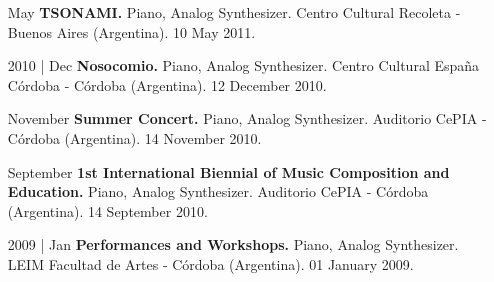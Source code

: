 \documentclass[12pt,overlapped]{res}%
\begin{document}
\begin{resume}
\begin{itemize}[align=parleft,leftmargin=2.25cm,labelwidth=2cm]
\item[May]
\textbf{TSONAMI.}
Piano, Analog Synthesizer. 
Centro Cultural Recoleta {-} Buenos Aires (Argentina). 
10 May 2011.
\end{itemize}%
\begin{itemize}[align=parleft,leftmargin=2.25cm,labelwidth=2cm]
\item[2010 | Dec]
\textbf{Nosocomio.}
Piano, Analog Synthesizer. 
Centro Cultural España Córdoba {-} Córdoba (Argentina). 
12 December 2010.
\end{itemize}%
\begin{itemize}[align=parleft,leftmargin=2.25cm,labelwidth=2cm]
\item[November]
\textbf{Summer Concert.}
Piano, Analog Synthesizer. 
Auditorio CePIA {-} Córdoba (Argentina). 
14 November 2010.
\end{itemize}%
\begin{itemize}[align=parleft,leftmargin=2.25cm,labelwidth=2cm]
\item[September]
\textbf{1st International Biennial of Music Composition and Education.}
Piano, Analog Synthesizer. 
Auditorio CePIA {-} Córdoba (Argentina). 
14 September 2010.
\end{itemize}%
\begin{itemize}[align=parleft,leftmargin=2.25cm,labelwidth=2cm]
\item[2009 | Jan]
\textbf{Performances and Workshops.}
Piano, Analog Synthesizer. 
LEIM Facultad de Artes {-} Córdoba (Argentina). 
01 January 2009.
\end{itemize}%

\end{resume}
\end{document}
